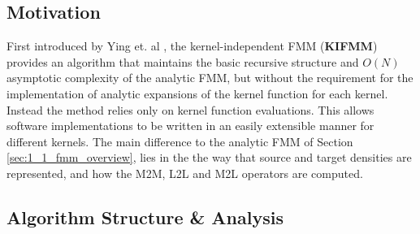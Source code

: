 \subsection{Motivation}

First introduced by Ying et. al \cite{Ying:2004:JCP}, the kernel-independent FMM (\textbf{\gls{KIFMM}})
provides an algorithm that maintains the basic recursive structure and $O(N)$
asymptotic complexity of the analytic FMM, but without the requirement for the
implementation of analytic expansions of the kernel function for each kernel.
Instead the method relies only on kernel function evaluations. This allows
software implementations to be written in an easily extensible manner for different
kernels. The main difference to the analytic FMM of Section \ref{sec:1_1_fmm_overview},
lies in the the way that source and target densities are represented, and how
the \gls{M2M}, \gls{L2L} and \gls{M2L} operators are computed.

\subsection{Algorithm Structure \& Analysis}

